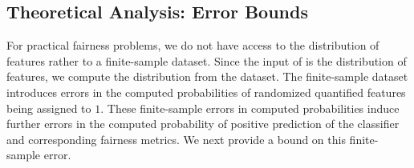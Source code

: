 
\iffalse
\red{While it is trivial to use conditional probability distribution for the RE encoding, it is not straightforward for the presented ER-encoding, which we leave as a future work. 
}
\fi

\begin{comment}
\red{Let $ \bool_i $ and $ \bool_j $ be two Boolean (non-sensitive) features and we want to encode their pair-wise correlation in {\justicia}. For an assignment to $ \bool_i, \bool_j $, we consider a new Boolean variable $ v $ and add a constraint $ v \leftrightarrow \bool_i \wedge \bool_j $ in the CNF $ \phi $ of the SSAT formula $ \Phi $. Additionally, $ v $ is given a randomized quantification in the prefix of $ \Phi $ and the probability of $ v $ is calculated as the probability of both $ \bool_i $ and $ \bool_j $ assigning to $ 1 $ in the distribution $ \mathcal{D} $. Note that, to encode the total correlation of all Boolean features, the mentioned approach introduces exponentially (with the number of features) many new variables and add an exponential number of constraints to $ \phi $ with an aim of computing a more precise satisfying probability of $ \Phi $. Optionally, one can encode the correlation among a selected set of features of interest in {\justicia}. }
\end{comment}


\subsection{Theoretical Analysis: Error Bounds}\label{fairness_justicia_sec:theory}
For practical fairness problems, we do not have access to the distribution of features rather to a finite-sample dataset. Since the input of {\justicia} is the distribution of features, we compute the distribution from the dataset. The finite-sample dataset introduces errors in the computed probabilities of randomized quantified features being assigned to $1$. These finite-sample errors in computed probabilities induce further errors in the computed probability of positive prediction of the classifier and corresponding fairness metrics. We next provide a bound on this finite-sample error.

